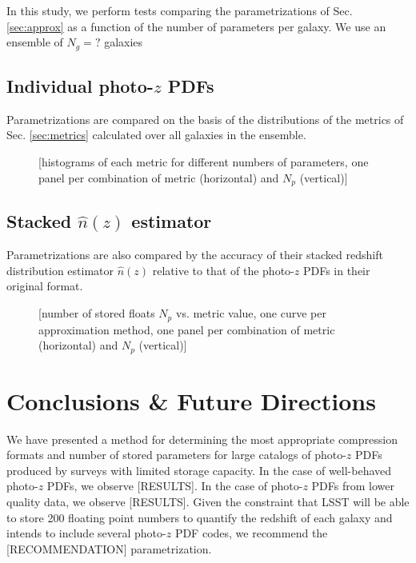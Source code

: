 \documentclass[\docopts]{\docclass}
\begin{document}
In this study, we perform tests comparing the parametrizations of Sec. 
\ref{sec:approx} as a function of the number of parameters per galaxy.  We use 
an ensemble of $N_{g}=?$ galaxies

\subsection{Individual photo-$z$ PDFs}
\label{sec:individual}

Parametrizations are compared on the basis of the distributions of the metrics 
of Sec. \ref{sec:metrics} calculated over all galaxies in the ensemble.

\begin{figure}
  \caption{[histograms of each metric for different numbers of parameters, one 
panel per combination of metric (horizontal) and $N_{p}$ (vertical)]
  \label{fig:individual}}
\end{figure}

\subsection{Stacked $\hat{n}(z)$ estimator}
\label{sec:stacked}

Parametrizations are also compared by the accuracy of their stacked redshift 
distribution estimator $\hat{n}(z)$ relative to that of the photo-$z$ PDFs in 
their original format.

\begin{figure}
  \caption{[number of stored floats $N_{p}$ vs. metric value, one curve per 
approximation method, one panel per combination of metric (horizontal) and 
$N_{p}$ (vertical)]
  \label{fig:stacked}}
\end{figure}





\section{Conclusions \& Future Directions}
\label{sec:conclusions}

We have presented a method for determining the most appropriate compression 
formats and number of stored parameters for large catalogs of photo-$z$ PDFs 
produced by surveys with limited storage capacity.   In the case of 
well-behaved photo-$z$ PDFs, we observe [RESULTS].  In the case of photo-$z$ 
PDFs from lower quality data, we observe [RESULTS].  Given the constraint that 
LSST will be able to store 200 floating point numbers to quantify the redshift 
of each galaxy and intends to include several photo-$z$ PDF codes, we recommend 
the [RECOMMENDATION] parametrization.
\end{document}
